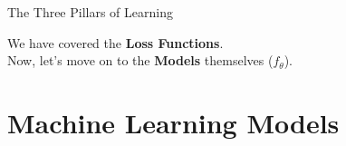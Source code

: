 \begin{frame}{The Three Pillars of Learning}

    \vspace{1em}

    \begin{block}{}
        We have covered the \textbf{Loss Functions}. \\
        Now, let's move on to the \textbf{Models} themselves ($f_\theta$).
    \end{block}
\end{frame}

\section{Machine Learning Models}

